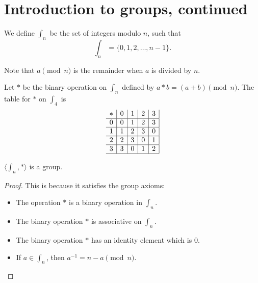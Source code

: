 
\section{Introduction to groups, continued}
    \renewcommand{\subsectionmark}{January 29, 2024}
    \begin{dfn}
        We define \(\int_n\) be the set of integers modulo \(n\), such that \[\int_n = \{0, 1, 2, \ldots, n - 1\}.\] 

        Note that \(a \pmod{n}\) is the remainder when \(a\) is divided by \(n\).
    \end{dfn}

    \begin{example}
        Let \(*\) be the binary operation on \(\int_n\) defined by \(a * b = (a + b)\pmod{n}\). The table for \(*\) on \(\int_4\) is
        \[
            \begin{array}{c|c|c|c|c|}
                * & 0 & 1 & 2 & 3 \\ \hline
                0 & 0 & 1 & 2 & 3 \\ \hline
                1 & 1 & 2 & 3 & 0 \\ \hline
                2 & 2 & 3 & 0 & 1 \\ \hline
                3 & 3 & 0 & 1 & 2 \\ \hline
            \end{array}
        \]
    \end{example}

    \begin{thm}
        \(\langle \int_n, * \rangle\) is a group.
    \end{thm}

    \begin{proof}
        This is because it satisfies the group axioms:
        \begin{itemize}
            \item The operation \(*\) is a binary operation in \(\int_n\).
            \item The binary operation \(*\) is associative on \(\int_n\).
            \item The binary operation \(*\) has an identity element which is \(0\).
            \item If \(a\in\int_n\), then \(a^{-1} = n - a \pmod{n}\).
        \end{itemize}
    \end{proof}


